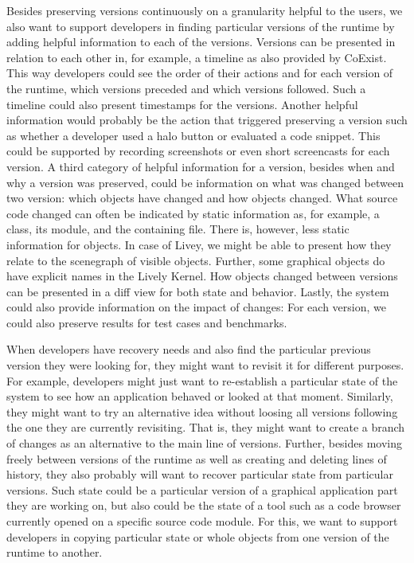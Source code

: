 Besides preserving versions continuously on a granularity helpful to the users, we also want to support developers in finding particular versions of the runtime by adding helpful information to each of the versions.
Versions can be presented in relation to each other in, for example, a timeline as also provided by CoExist.
This way developers could see the order of their actions and for each version of the runtime, which versions preceded and which versions followed.
Such a timeline could also present timestamps for the versions.
Another helpful information would probably be the action that triggered preserving a version such as whether a developer used a halo button or evaluated a code snippet.
This could be supported by recording screenshots or even short screencasts for each version.
A third category of helpful information for a version, besides when and why a version was preserved, could be information on what was changed between two version: which objects have changed and how objects changed.
What source code changed can often be indicated by static information as, for example, a class, its module, and the containing file.
There is, however, less static information for objects.
In case of Livey, we might be able to present how they relate to the scenegraph of visible objects.
Further, some graphical objects do have explicit names in the Lively Kernel.
How objects changed between versions can be presented in a diff view for both state and behavior.
Lastly, the system could also provide information on the impact of changes: For each version, we could also preserve results for test cases and benchmarks.

When developers have recovery needs and also find the particular previous version they were looking for, they might want to revisit it for different purposes.
For example, developers might just want to re-establish a particular state of the system to see how an application behaved or looked at that moment.
Similarly, they might want to try an alternative idea without loosing all versions following the one they are currently revisiting.
That is, they might want to create a branch of changes as an alternative to the main line of versions.
Further, besides moving freely between versions of the runtime as well as creating and deleting lines of history, they also probably will want to recover particular state from particular versions.
Such state could be a particular version of a graphical application part they are working on, but also could be the state of a tool such as a code browser currently opened on a specific source code module.
For this, we want to support developers in copying particular state or whole objects from one version of the runtime to another.

